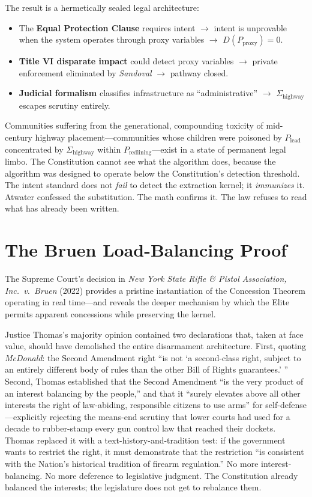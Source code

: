 \documentclass[12pt,openany]{book}
\providecommand{\tightlist}{\setlength{\itemsep}{0pt}\setlength{\parskip}{0pt}}
\begin{document}
The result is a hermetically sealed legal architecture:
\begin{itemize}
\tightlist
\item The \textbf{Equal Protection Clause} requires intent $\rightarrow$ intent is unprovable when the system operates through proxy variables $\rightarrow$ $D(P_{\text{proxy}}) = 0$.
\item \textbf{Title VI disparate impact} could detect proxy variables $\rightarrow$ private enforcement eliminated by \textit{Sandoval} $\rightarrow$ pathway closed.
\item \textbf{Judicial formalism} classifies infrastructure as ``administrative'' $\rightarrow$ $\Sigma_{\text{highway}}$ escapes scrutiny entirely.
\end{itemize}

Communities suffering from the generational, compounding toxicity of mid-century highway placement---communities whose children were poisoned by $P_{\text{lead}}$ concentrated by $\Sigma_{\text{highway}}$ within $P_{\text{redlining}}$---exist in a state of permanent legal limbo. The Constitution cannot see what the algorithm does, because the algorithm was designed to operate below the Constitution's detection threshold. The intent standard does not \textit{fail} to detect the extraction kernel; it \textit{immunizes} it. Atwater confessed the substitution. The math confirms it. The law refuses to read what has already been written.

\section{The Bruen Load-Balancing Proof}

The Supreme Court's decision in \textit{New York State Rifle \& Pistol Association, Inc.\ v.\ Bruen} (2022) provides a pristine instantiation of the Concession Theorem operating in real time---and reveals the deeper mechanism by which the Elite permits apparent concessions while preserving the kernel.

Justice Thomas's majority opinion contained two declarations that, taken at face value, should have demolished the entire disarmament architecture. First, quoting \textit{McDonald}: the Second Amendment right ``is not `a second-class right, subject to an entirely different body of rules than the other Bill of Rights guarantees.' '' Second, Thomas established that the Second Amendment ``is the very product of an interest balancing by the people,'' and that it ``surely elevates above all other interests the right of law-abiding, responsible citizens to use arms'' for self-defense---explicitly rejecting the means-end scrutiny that lower courts had used for a decade to rubber-stamp every gun control law that reached their dockets. Thomas replaced it with a text-history-and-tradition test: if the government wants to restrict the right, it must demonstrate that the restriction ``is consistent with the Nation's historical tradition of firearm regulation.'' No more interest-balancing. No more deference to legislative judgment. The Constitution already balanced the interests; the legislature does not get to rebalance them.
\end{document}
